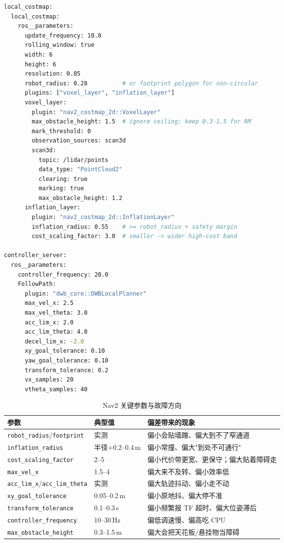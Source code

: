 \begin{lstlisting}[language=bash,caption={Nav2 参数片段（局部代价地图 + 控制器）},label={lst:27-nav2}]
local_costmap:
  local_costmap:
    ros__parameters:
      update_frequency: 10.0
      rolling_window: true
      width: 6
      height: 6
      resolution: 0.05
      robot_radius: 0.28          # or footprint polygon for non-circular
      plugins: ["voxel_layer", "inflation_layer"]
      voxel_layer:
        plugin: "nav2_costmap_2d::VoxelLayer"
        max_obstacle_height: 1.5  # ignore ceiling; keep 0.3-1.5 for RM
        mark_threshold: 0
        observation_sources: scan3d
        scan3d:
          topic: /lidar/points
          data_type: "PointCloud2"
          clearing: true
          marking: true
          max_obstacle_height: 1.2
      inflation_layer:
        plugin: "nav2_costmap_2d::InflationLayer"
        inflation_radius: 0.55    # >= robot_radius + safety margin
        cost_scaling_factor: 3.0  # smaller -> wider high-cost band

controller_server:
  ros__parameters:
    controller_frequency: 20.0
    FollowPath:
      plugin: "dwb_core::DWBLocalPlanner"
      max_vel_x: 2.5
      max_vel_theta: 3.0
      acc_lim_x: 2.0
      acc_lim_theta: 4.0
      decel_lim_x: -2.0
      xy_goal_tolerance: 0.10
      yaw_goal_tolerance: 0.10
      transform_tolerance: 0.2
      vx_samples: 20
      vtheta_samples: 40
\end{lstlisting}

\begin{table}[htbp]
  \centering
  \caption{Nav2 关键参数与故障方向}\label{tab:27-nav2}
  \footnotesize
  \begin{tabular}{p{4.2cm}p{2.4cm}p{6.8cm}}
    \toprule
    参数 & 典型值 & 偏差带来的现象 \\
    \midrule
    \lstinline{robot_radius}/\lstinline{footprint} & 实测 & 偏小会贴墙蹭、偏大到不了窄通道 \\
    \lstinline{inflation_radius} & 半径$+0.2$--$0.4$\,m & 偏小常撞、偏大"到处不可通行" \\
    \lstinline{cost_scaling_factor} & 2--5 & 偏小代价带更宽、更保守；偏大贴着障碍走 \\
    \lstinline{max_vel_x} & 1.5--4 & 偏大来不及转、偏小效率低 \\
    \lstinline{acc_lim_x}/\lstinline{acc_lim_theta} & 实测 & 偏大轨迹抖动、偏小走不动 \\
    \lstinline{xy_goal_tolerance} & 0.05--0.2\,m & 偏小原地抖、偏大停不准 \\
    \lstinline{transform_tolerance} & 0.1--0.3\,s & 偏小频繁报 TF 超时、偏大位姿滞后 \\
    \lstinline{controller_frequency} & 10--30\,Hz & 偏低调速慢、偏高吃 CPU \\
    \lstinline{max_obstacle_height} & 0.3--1.5\,m & 偏大会把天花板/悬挂物当障碍 \\
    \bottomrule
  \end{tabular}
\end{table}

